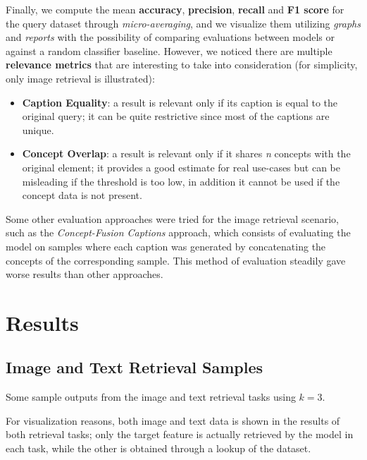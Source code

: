 \documentclass[10pt,twocolumn,letterpaper]{article}
\begin{document}
Finally, we compute the mean \textbf{accuracy}, \textbf{precision}, \textbf{recall} and \textbf{F1 score} for the query dataset through \textit{micro-averaging}, and we visualize them utilizing \textit{graphs} and \textit{reports} with the possibility of comparing evaluations between models or against a random classifier baseline.
However, we noticed there are multiple \textbf{relevance metrics} that are interesting to take into consideration (for simplicity, only image retrieval is illustrated):
\begin{itemize}
   \item \textbf{Caption Equality}: a result is relevant only if its caption is equal to the original query; it can be quite restrictive since most of the captions are unique.
   \item \textbf{Concept Overlap}: a result is relevant only if it shares \textit{n} concepts with the original element; it provides a good estimate for real use-cases but can be misleading if the threshold is too low, in addition it cannot be used if the concept data is not present.
\end{itemize}

Some other evaluation approaches were tried for the image retrieval scenario, such as the \textit{Concept-Fusion Captions} approach, which consists of evaluating the model on samples where each caption was generated by concatenating the concepts of the corresponding sample.
This method of evaluation steadily gave worse results than other approaches.


\section{Results}

\subsection{Image and Text Retrieval Samples}
Some sample outputs from the image and text retrieval tasks using $k=3$.

For visualization reasons, both image and text data is shown in the results of both retrieval tasks; only the target feature is actually retrieved by the model in each task, while the other is obtained through a lookup of the dataset.
\end{document}
